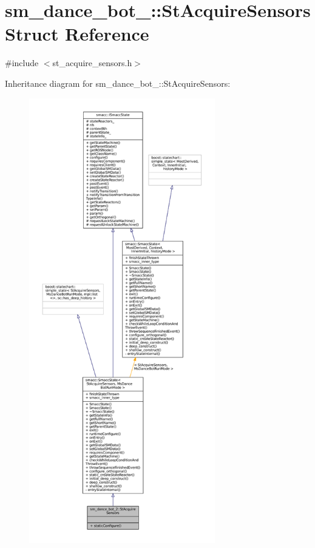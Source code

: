 \hypertarget{structsm__dance__bot__2_1_1StAcquireSensors}{}\section{sm\+\_\+dance\+\_\+bot\+\_\+:\+:St\+Acquire\+Sensors Struct Reference}
\label{structsm__dance__bot__2_1_1StAcquireSensors}


{\ttfamily \#include $<$st\+\_\+acquire\+\_\+sensors.\+h$>$}



Inheritance diagram for sm\+\_\+dance\+\_\+bot\+\_\+:\+:St\+Acquire\+Sensors\+:
\nopagebreak
\begin{figure}[H]
\begin{center}
\leavevmode
\includegraphics[height=550pt]{structsm__dance__bot__2_1_1StAcquireSensors__inherit__graph}
\end{center}
\end{figure}



